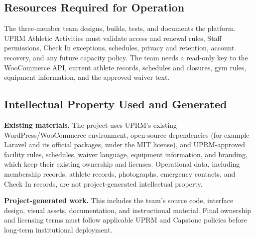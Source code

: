 \subsection{Resources Required for Operation}

The three-member team designs, builds, tests, and documents the platform. UPRM Athletic Activities must validate access and renewal rules, Staff permissions, Check In exceptions, schedules, privacy and retention, account recovery, and any future capacity policy. The team needs a read-only key to the WooCommerce API, current athlete records, schedules and closures, gym rules, equipment information, and the approved waiver text.



\subsection{Intellectual Property Used and Generated}

\textbf{Existing materials.} The project uses UPRM's existing WordPress/WooCommerce environment, open-source dependencies (for example Laravel and its official packages, under the MIT license), and UPRM-approved facility rules, schedules, waiver language, equipment information, and branding, which keep their existing ownership and licenses. Operational data, including membership records, athlete records, photographs, emergency contacts, and Check In records, are not project-generated intellectual property.

\textbf{Project-generated work.} This includes the team's source code, interface design, visual assets, documentation, and instructional material. Final ownership and licensing terms must follow applicable UPRM and Capstone policies before long-term institutional deployment.

